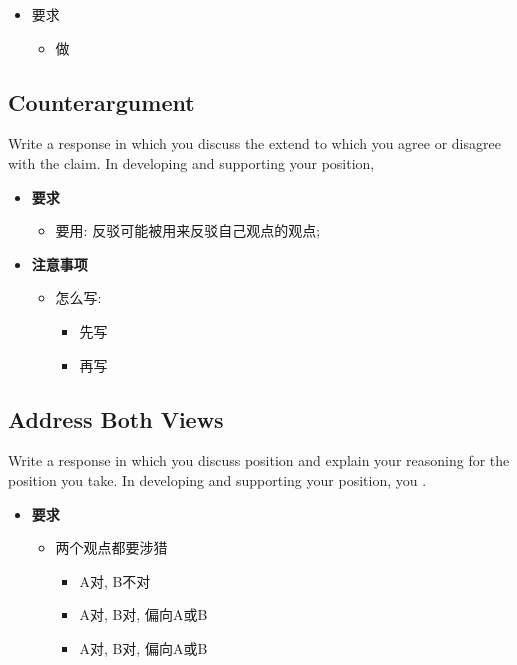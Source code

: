    \begin{itemize}
      \item 要求
      \begin{itemize}
        \item 做
      \end{itemize}
    \end{itemize}

  \subsection{Counterargument}

    Write a response in which you discuss the extend to which you agree or
    disagree with the claim. In developing and supporting your position,

    \begin{itemize}
      \item \textbf{要求}
      \begin{itemize}
        \item 要用:  反驳可能被用来反驳自己观点的观点;
      \end{itemize}

      \item \textbf{注意事项}
      \begin{itemize}
        \item 怎么写:
        \begin{itemize}
          \item 先写
          \item 再写
        \end{itemize}
      \end{itemize}
    \end{itemize}

  \subsection{Address Both Views}

    Write a response in which you discuss  position and explain your reasoning for the
    position you take. In developing and supporting your position, you
    .

    \begin{itemize}
      \item \textbf{要求}
      \begin{itemize}
        \item 两个观点都要涉猎
        \begin{itemize}
          \item A对, B不对
          \item A对, B对, 偏向A或B
          \item A对, B对, 偏向A或B
        \end{itemize}
      \end{itemize}
    \end{itemize}

